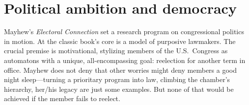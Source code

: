 \documentclass[letter,12pt]{article}
\begin{document}




\section{Political ambition and democracy}

Mayhew's \emph{Electoral Connection} \citeyearpar{mayhew.1974} set a research program on congressional politics in motion. At the classic book's core is a model of purposive lawmakers. The crucial premise is motivational, stylizing members of the U.S.\ Congress as automatons with a unique, all-encompassing goal: reelection for another term in office. Mayhew does not deny that other worries might deny members a good night sleep---turning a prioritary program into law, climbing the chamber's hierarchy, her/his legacy are just some examples. But none of that would be achieved if the member fails to reelect. %
\end{document}
